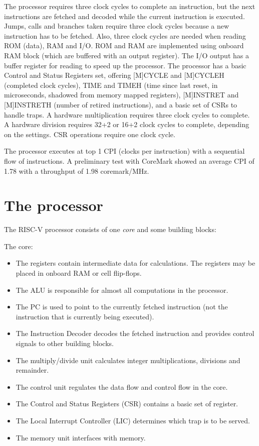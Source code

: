 \documentclass[12pt]{article}
\begin{document}
The processor requires three clock cycles to complete an instruction, but the next instructions are fetched and decoded while the current instruction is executed. Jumps, calls and branches taken require three clock cycles because a new instruction has to be fetched. Also, three clock cycles are needed when reading ROM (data), RAM and I/O. ROM and RAM are implemented using onboard RAM block (which are buffered with an output register). The I/O output has a buffer register for reading to speed up the processor. The processor has a basic Control and Status Registers set, offering [M]CYCLE and [M]CYCLEH (completed clock cycles), TIME and TIMEH (time since last reset, in microseconds, shadowed from memory mapped registers), [M]INSTRET and [M]INSTRETH (number of retired instructions), and a basic set of CSRs to handle traps. A hardware multiplication requires three clock cycles to complete. A hardware division requires 32+2 or 16+2 clock cycles to complete, depending on the settings. CSR operations require one clock cycle.

The processor executes at top 1 CPI (clocks per instruction) with a sequential flow of instructions. A preliminary test with CoreMark showed an average CPI of 1.78 with a throughput of 1.98 coremark/MHz.

\section{The processor}
The RISC-V processor consists of one \textit{core} and some building blocks:

The core:
\begin{itemize}
\item The registers contain intermediate data for calculations. The registers may be placed in onboard RAM or cell flip-flops.
\item The ALU is responsible for almost all computations in the processor.
\item The PC is used to point to the currently fetched instruction (not the instruction that is currently being executed).
\item The Instruction Decoder decodes the fetched instruction and provides control signals to other building blocks.
\item The multiply/divide unit calculates integer multiplications, divisions and remainder.
\item The control unit regulates the data flow and control flow in the core.
\item The Control and Status Registers (CSR) contains a basic set of register.
\item The Local Interrupt Controller (LIC) determines which trap is to be served.
\item The memory unit interfaces with memory.
\end{itemize}
\end{document}
